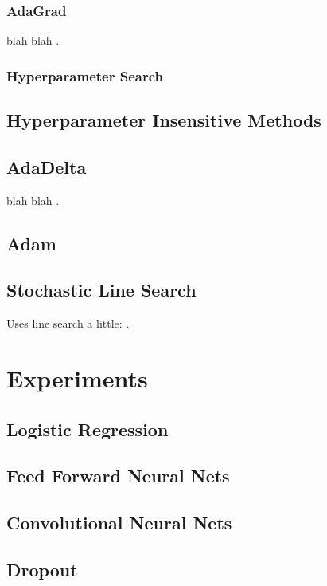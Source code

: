 \documentclass{article} %
\begin{document}
\subsubsection{AdaGrad}
blah blah \citep{duchi2011adaptive}.

\subsubsection{Hyperparameter Search}

\subsection{Hyperparameter Insensitive Methods}
\subsection{AdaDelta}
blah blah \citep{zeiler_adadelta:_2012}.

\subsection{Adam}
\cite{kingma2014adam}

\subsection{Stochastic Line Search} 
Uses line search a little: 
\citep{ngiam2011optimization}.
\citep{mahsereci2015probabilistic}
\citep{bache2014hot}

\section{Experiments}
\subsection{Logistic Regression}

\subsection{Feed Forward Neural Nets}

\subsection{Convolutional Neural Nets}

\subsection{Dropout}
\end{document}
